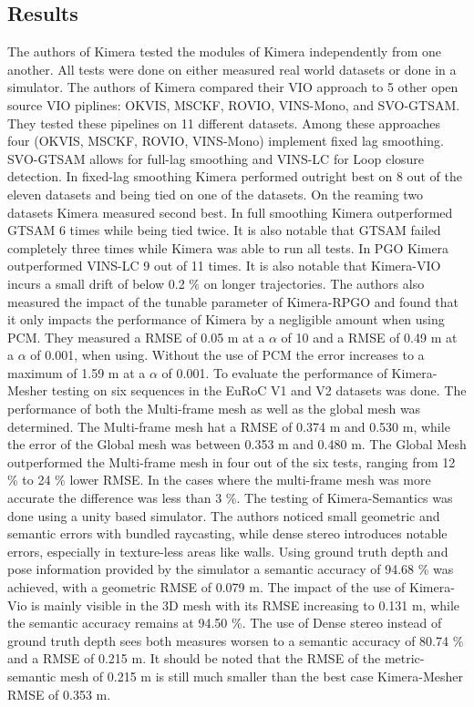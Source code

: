\documentclass[11pt,a4paper]{article}
\begin{document}
\subsection{Results}
The authors of Kimera tested the modules of Kimera independently from one another. 
All tests were done on either measured real world datasets or done in a simulator.
The authors of Kimera compared their VIO approach to 5 other open source VIO piplines: OKVIS, MSCKF, ROVIO, VINS-Mono, and SVO-GTSAM.
They tested these pipelines on 11 different datasets.
Among these approaches four (OKVIS, MSCKF, ROVIO, VINS-Mono) implement fixed lag smoothing. 
SVO-GTSAM allows for full-lag smoothing and VINS-LC for Loop closure detection. 
In fixed-lag smoothing Kimera performed outright best on 8 out of the eleven datasets and being tied on one of the datasets. 
On the reaming two datasets Kimera measured second best.
In full smoothing Kimera outperformed GTSAM 6 times while being tied twice. 
It is also notable that GTSAM failed completely three times while Kimera was able to run all tests.
In PGO Kimera outperformed VINS-LC 9 out of 11 times. 
It is also notable that Kimera-VIO incurs a small drift of below 0.2 $\%$ on longer trajectories. 
The authors also measured the impact of the tunable parameter of Kimera-RPGO and found that it only impacts the performance of Kimera by a negligible amount when using PCM.
They measured a RMSE of 0.05 m at a $\alpha$ of 10 and a RMSE of 0.49 m at a $\alpha$ of 0.001, when using. 
Without the use of PCM the error increases to a maximum of 1.59 m at a $\alpha$ of 0.001. 
To evaluate the performance of Kimera-Mesher testing on six sequences in the EuRoC V1 and V2 datasets was done. 
The performance of both the Multi-frame mesh as well as the global mesh was determined. 
The Multi-frame mesh hat a RMSE of 0.374 m and 0.530 m, while the error of the Global mesh was between 0.353 m and 0.480 m.
The Global Mesh outperformed the Multi-frame mesh in four out of the six tests, ranging from 12 \% to 24 \% lower RMSE.
In the cases where the multi-frame mesh was more accurate the difference was less than 3 \%.
The testing of Kimera-Semantics was done using a unity based simulator. 
The authors noticed small geometric and semantic errors with bundled raycasting, while dense stereo introduces notable errors, especially in texture-less areas like walls. 
Using ground truth depth and pose information provided by the simulator a semantic accuracy of 94.68 \% was achieved, with a geometric RMSE of 0.079 m.
The impact of the use of Kimera-Vio is mainly visible in the 3D mesh with its RMSE increasing to 0.131 m, while the semantic accuracy remains at 94.50 \%. 
The use of Dense stereo instead of ground truth depth sees both measures worsen to a semantic accuracy of 80.74 \% and a RMSE of 0.215 m.
It should be noted that the RMSE of the metric-semantic mesh of 0.215 m is still much smaller than the best case Kimera-Mesher RMSE of 0.353 m.
\end{document}
